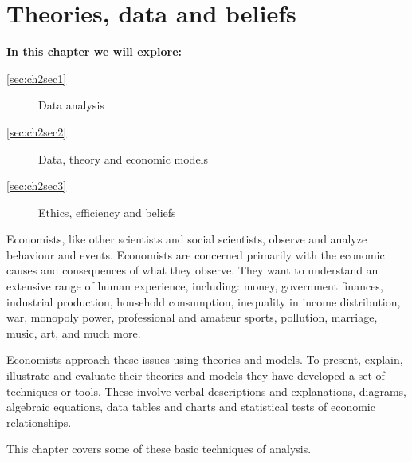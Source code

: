 \chapter{Theories, data and beliefs}\label{chap:tmd}

\begin{topics}
	\textbf{In this chapter we will explore:}
	\begin{description}
		\item[\ref{sec:ch2sec1}] Data analysis
		\item[\ref{sec:ch2sec2}] Data, theory and economic models
		\item[\ref{sec:ch2sec3}] Ethics, efficiency and beliefs
	\end{description}
\end{topics}

Economists, like other scientists and social scientists, observe and analyze
behaviour and events. Economists are concerned primarily with the economic
causes and consequences of what they observe. They want to understand an
extensive range of human experience, including: money, government finances,
industrial production, household consumption, inequality in income
distribution, war, monopoly power, professional and amateur sports,
pollution, marriage, music, art, and much more.

Economists approach these issues using theories and models. To present,
explain, illustrate and evaluate their theories and models they have
developed a set of techniques or tools. These involve verbal descriptions
and explanations, diagrams, algebraic equations, data tables and charts and
statistical tests of economic relationships.

This chapter covers some of these basic techniques of analysis.
